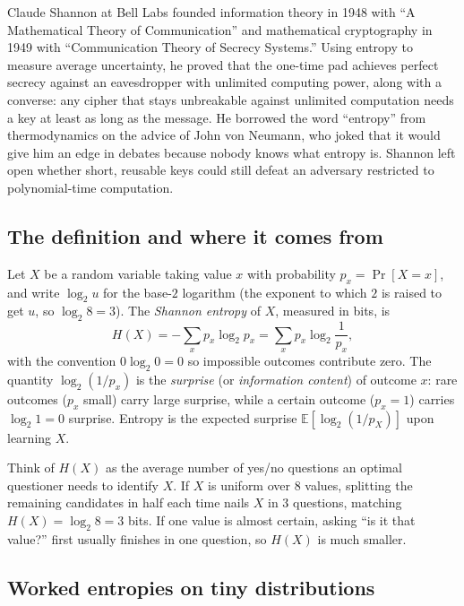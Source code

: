 \begin{historybox}
Claude Shannon at Bell Labs founded information theory in 1948 with ``A Mathematical Theory of Communication'' and mathematical cryptography in 1949 with ``Communication Theory of Secrecy Systems.'' Using entropy to measure average uncertainty, he proved that the one-time pad achieves perfect secrecy against an eavesdropper with unlimited computing power, along with a converse: any cipher that stays unbreakable against unlimited computation needs a key at least as long as the message. He borrowed the word ``entropy'' from thermodynamics on the advice of John von Neumann, who joked that it would give him an edge in debates because nobody knows what entropy is. Shannon left open whether short, reusable keys could still defeat an adversary restricted to polynomial-time computation.
\end{historybox}

\subsection{The definition and where it comes from}

Let $X$ be a random variable taking value $x$ with probability $p_x = \Pr[X = x]$, and write $\log_2 u$ for the base-$2$ logarithm (the exponent to which $2$ is raised to get $u$, so $\log_2 8 = 3$). The \emph{Shannon entropy} of $X$, measured in bits, is
\[
  H(X) = -\sum_{x} p_x \log_2 p_x = \sum_{x} p_x \log_2 \frac{1}{p_x},
\]
with the convention $0 \log_2 0 = 0$ so impossible outcomes contribute zero. The quantity $\log_2(1/p_x)$ is the \emph{surprise} (or \emph{information content}) of outcome $x$: rare outcomes ($p_x$ small) carry large surprise, while a certain outcome ($p_x = 1$) carries $\log_2 1 = 0$ surprise. Entropy is the expected surprise $\mathbb{E}[\log_2(1/p_X)]$ upon learning $X$.

\begin{intuitionbox}
Think of $H(X)$ as the average number of yes/no questions an optimal questioner needs to identify $X$. If $X$ is uniform over $8$ values, splitting the remaining candidates in half each time nails $X$ in $3$ questions, matching $H(X) = \log_2 8 = 3$ bits. If one value is almost certain, asking ``is it that value?'' first usually finishes in one question, so $H(X)$ is much smaller.
\end{intuitionbox}

\subsection{Worked entropies on tiny distributions}

